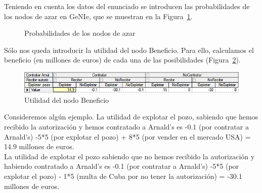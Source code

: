 \documentclass[12pt,a4paper,openright,final]{article}
\begin{document}
Teniendo en cuenta los datos del enunciado se introducen las probabilidades de los nodos de azar en GeNIe, que se muestran en la Figura~\ref{fig:azar}.

\begin{figure}[htbp!]
	\centering
	\hspace{10mm}
	\vspace{10mm}
	\caption{Probabilidades de los nodos de azar} \label{fig:azar}
\end{figure}

Sólo nos queda introducir la utilidad del nodo Beneficio. Para ello, calculamos el beneficio (en millones de euros) de cada una de las posibilidades (Figura~\ref{fig:utilidad}).\\

\begin{figure}[tbph!]
	\centering
	\includegraphics[width=\linewidth]{imagenes/utilidad.png}
	\caption{Utilidad del nodo Beneficio}
	\label{fig:utilidad}
\end{figure}

Consideremos algún ejemplo. La utilidad de explotar el pozo, sabiendo que hemos recibido la autorización y hemos contratado a Arnald's es -0.1 (por contratar a Arnald's) -5*5 (por explotar el pozo) + 8*5 (por vender en el mercado USA) = 14.9 millones de euros.\\

La utilidad de explotar el pozo sabiendo que no hemos recibido la autorización y habiendo contratado a Arnald's es -0.1 (por contratar a Arnald's) -5*5 (por explotar el pozo) - 1*5 (multa de Cuba por no tener la autorización) = -30.1 millones de euros.\\
\end{document}
